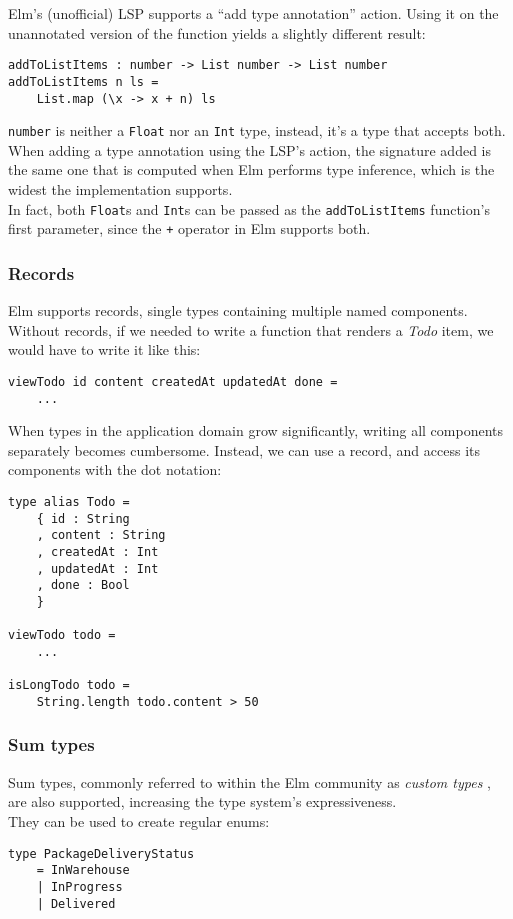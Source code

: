 Elm's (unofficial) LSP supports a ``add type annotation'' action. Using it on the unannotated version of the function yields a slightly different result:
\begin{verbatim}
addToListItems : number -> List number -> List number
addToListItems n ls =
    List.map (\x -> x + n) ls
\end{verbatim}
\texttt{number} is neither a \texttt{Float} nor an \texttt{Int} type, instead, it's a type that accepts both. When adding a type annotation using the LSP's action, the signature added is the same one that is computed when Elm performs type inference, which is the widest the implementation supports.\\
In fact, both \texttt{Float}s and \texttt{Int}s can be passed as the \texttt{addToListItems} function's first parameter, since the \texttt{+} operator in Elm supports both.

\subsubsection{Records}
Elm supports records, single types containing multiple named components. Without records, if we needed to write a function that renders a \textit{Todo} item, we would have to write it like this:
\begin{verbatim}
viewTodo id content createdAt updatedAt done =
    ...
\end{verbatim}
When types in the application domain grow significantly, writing all components separately becomes cumbersome. Instead, we can use a record, and access its components with the dot notation:
\begin{verbatim}
type alias Todo =
    { id : String
    , content : String
    , createdAt : Int
    , updatedAt : Int
    , done : Bool
    }

viewTodo todo =
    ...

isLongTodo todo =
    String.length todo.content > 50
\end{verbatim}

\subsubsection{Sum types}
Sum types, commonly referred to within the Elm community as \textit{custom types} \cite{noauthor_custom_nodate}, are also supported, increasing the type system's expressiveness.\\

They can be used to create regular enums:
\begin{verbatim}
type PackageDeliveryStatus
    = InWarehouse
    | InProgress
    | Delivered
\end{verbatim}

